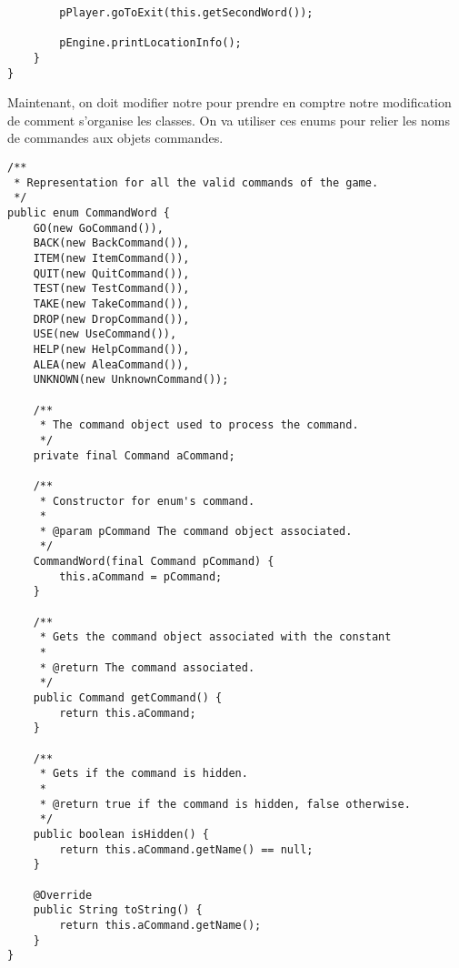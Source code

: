 \begin{exercise}[subtitle=Commande abstraite]
\begin{verbatim}
        pPlayer.goToExit(this.getSecondWord());

        pEngine.printLocationInfo();
    }
}
\end{verbatim}

Maintenant, on doit modifier notre  pour prendre en comptre notre modification de comment s'organise les classes. On va utiliser ces enums pour relier les noms de commandes aux objets commandes.

\begin{verbatim}
/**
 * Representation for all the valid commands of the game.
 */
public enum CommandWord {
    GO(new GoCommand()),
    BACK(new BackCommand()),
    ITEM(new ItemCommand()),
    QUIT(new QuitCommand()),
    TEST(new TestCommand()),
    TAKE(new TakeCommand()),
    DROP(new DropCommand()),
    USE(new UseCommand()),
    HELP(new HelpCommand()),
    ALEA(new AleaCommand()),
    UNKNOWN(new UnknownCommand());

    /**
     * The command object used to process the command.
     */
    private final Command aCommand;

    /**
     * Constructor for enum's command.
     *
     * @param pCommand The command object associated.
     */
    CommandWord(final Command pCommand) {
        this.aCommand = pCommand;
    }

    /**
     * Gets the command object associated with the constant
     *
     * @return The command associated.
     */
    public Command getCommand() {
        return this.aCommand;
    }

    /**
     * Gets if the command is hidden.
     *
     * @return true if the command is hidden, false otherwise.
     */
    public boolean isHidden() {
        return this.aCommand.getName() == null;
    }

    @Override
    public String toString() {
        return this.aCommand.getName();
    }
}
\end{verbatim}
\end{exercise}

\begin{exercise}[subtitle=Character]



\end{exercise}

\begin{exercise}[subtitle=Moving character]



\end{exercise}


